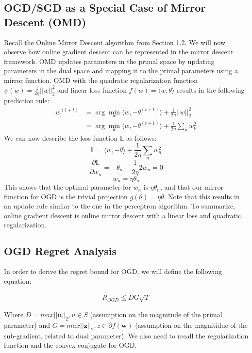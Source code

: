 \documentclass[11pt]{article}
\begin{document}
\subsection{OGD/SGD as a Special Case of Mirror Descent (OMD)}
Recall the Online Mirror Descent algorithm from Section 1.2. We will now observe how online gradient descent can be represented in the mirror descent framework. OMD updates parameters in the primal space by updating parameters in the dual space and mapping it to the primal parameters using a mirror function. OMD with the quadratic regularization function $\psi(w) = \frac{1}{2\eta} ||w||^2_2 $ and linear loss function $f(w) = \langle w, \theta \rangle$ results in the following prediction rule:
\begin{align*}
w^{(1+t)} &= \arg \min\limits_{w} \langle w, -\theta^{(t+1)} \rangle  + \frac{1}{2\eta} ||w||^2_2 \\
 &= \arg \min\limits_{w} \langle w, -\theta^{(t+1)} \rangle  + \frac{1}{2\eta} \sum\limits_n w^2_n
\end{align*}
We can now describe the loss function $\mathbb{L}$ as follows:
$$\mathbb{L} = \langle w, -\theta \rangle + \frac{1}{2\eta} \sum\limits_n w^2_n$$
$$\frac{\partial \mathbb{L}}{\partial w_n} = -\theta_n + \frac{1}{2\eta} 2w_n = 0$$
$$w_n = \eta\theta_n$$
This shows that the optimal parameter for $w_n$ is $\eta \theta_n$, and that our mirror function for OGD is the trivial projection $g(\theta) = \eta\theta$. Note that this results in an update rule similar to the one in the perceptron algorithm. To summarize, online gradient descent is online mirror descent with a linear loss and quadratic regularization.


\subsection{OGD Regret Analysis}

In order to derive the regret bound for OGD, we will define the following equation:

\begin{align}
    R_{OGD} \leq DG\sqrt{T}
\end{align}

Where $D = max || \textbf{u} ||_2, u \in S$ (assumption on the magnitude of the primal parameter) and $G = max || \textbf{z} ||_2, z \in \partial f(\textbf{w})$ (assumption on the magnitidue of the sub-gradient, related to dual parameter). We also need to recall the regularization function and the convex conjugate for OGD. 
\end{document}
